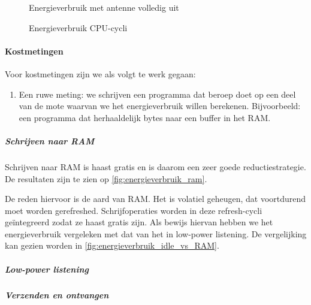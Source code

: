 \documentclass{article}
\begin{document}
\begin{figure}[h]
\centering
\missingfigure{}
\caption{Energieverbruik met antenne volledig uit}
\label{fig:energieverbruik_antenne_uit}
\end{figure}

\begin{figure}[h]
\centering

\caption{Energieverbruik CPU-cycli}
\label{fig:energieverbruik_cpu}
\end{figure}

\paragraph{Kostmetingen}

Voor kostmetingen zijn we als volgt te werk gegaan:

\begin{enumerate}
\item Een ruwe meting: we schrijven een programma dat beroep doet op een deel
van de mote waarvan we het energieverbruik willen berekenen. Bijvoorbeeld: een
programma dat herhaaldelijk bytes naar een buffer in het RAM. 
\end{enumerate}

\subparagraph{Schrijven naar RAM}

Schrijven naar RAM is haast gratis en is daarom een zeer goede
reductiestrategie. De resultaten zijn te zien op \ref{fig:energieverbruik_ram}.

De reden hiervoor is de aard van RAM. Het is volatiel geheugen, dat voortdurend
moet worden gerefreshed. Schrijfoperaties worden in deze refresh-cycli
ge\"integreerd zodat ze haast gratis zijn. Als bewijs hiervan hebben we het energieverbruik vergeleken met dat van het in low-power listening. 
De vergelijking kan gezien worden in \ref{fig:energieverbruik_idle_vs_RAM}.\\
\subparagraph{Low-power listening}



\subparagraph{Verzenden en ontvangen}

\end{document}
